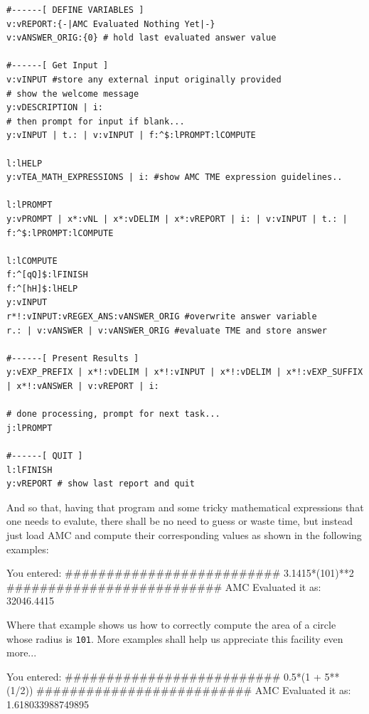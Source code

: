 \documentclass[a4paper, 18pt]{book} %
\begin{document}
{{{{\begin{tcolorbox}[teaterminalstyle, title=TEA Program:  Advanced Mathematics Computer v3.1, breakable]
\begin{lstlisting}[language=TEA,breaklines=true,]
#------[ DEFINE VARIABLES ]
v:vREPORT:{-|AMC Evaluated Nothing Yet|-}
v:vANSWER_ORIG:{0} # hold last evaluated answer value

#------[ Get Input ]
v:vINPUT #store any external input originally provided
# show the welcome message
y:vDESCRIPTION | i:
# then prompt for input if blank...
y:vINPUT | t.: | v:vINPUT | f:^$:lPROMPT:lCOMPUTE

l:lHELP
y:vTEA_MATH_EXPRESSIONS | i: #show AMC TME expression guidelines..

l:lPROMPT
y:vPROMPT | x*:vNL | x*:vDELIM | x*:vREPORT | i: | v:vINPUT | t.: | f:^$:lPROMPT:lCOMPUTE

l:lCOMPUTE
f:^[qQ]$:lFINISH
f:^[hH]$:lHELP
y:vINPUT 
r*!:vINPUT:vREGEX_ANS:vANSWER_ORIG #overwrite answer variable
r.: | v:vANSWER | v:vANSWER_ORIG #evaluate TME and store answer

#------[ Present Results ]
y:vEXP_PREFIX | x*!:vDELIM | x*!:vINPUT | x*!:vDELIM | x*!:vEXP_SUFFIX | x*!:vANSWER | v:vREPORT | i:

# done processing, prompt for next task...
j:lPROMPT

#------[ QUIT ]
l:lFINISH
y:vREPORT # show last report and quit
   \end{lstlisting}
  \end{tcolorbox}
  \caption{TEA APPLICATION: Advanced Mathematics Computer v3.1}
  \label{FIGR3}
}


And so that, having that program and some tricky mathematical expressions that one needs to evalute, there shall be no need to guess or waste time, but instead just load AMC and compute their corresponding values as shown in the following examples:

\vspace{2em}

     \begin{tcbverbatim}[title=Sample OUTPUT 1 from AMC v3.1]
You entered:
##########################
3.1415*(101)**2
##########################
AMC Evaluated it as: 32046.4415
  \end{tcbverbatim}


\vspace{2em}

Where that example shows us how to correctly compute the area of a circle whose radius is \texttt{101}. More examples shall help us appreciate this facility even more...

\vspace{2em}

     \begin{tcbverbatim}[title=Sample OUTPUT 2 from AMC v3.1]
You entered:
##########################
0.5*(1 + 5**(1/2))
##########################
AMC Evaluated it as: 1.618033988749895
  \end{tcbverbatim}


}}}
\end{document}
